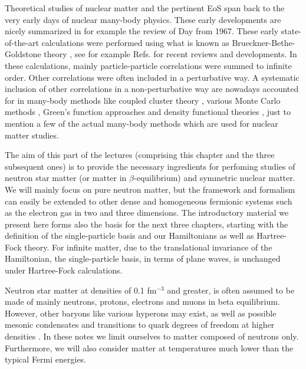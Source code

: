 Theoretical studies of nuclear matter and the pertinent EoS span back
to the very early days of nuclear many-body physics. These early
developments are nicely summarized in for example the review of
Day \cite{day1967} from 1967. These early state-of-the-art
calculations were performed using what is known as
Brueckner-Bethe-Goldstone theory \cite{brueckner1954,brueckner1955}, see for example
Refs.\cite{hh2000,baldo2012,baldo2012a} for recent reviews and developments.  In
these calculations, mainly particle-particle correlations were summed
to infinite order.  Other correlations were often included in a
perturbative way. A systematic inclusion of other correlations in a
non-perturbative way are nowadays accounted for in many-body methods
like coupled cluster theory \cite{bartlett2007,shavittbartlett2009},
various Monte Carlo methods \cite{gandolfi2009,lovato2012}, Green's
function approaches \cite{baldo2012a,carbone2013,dickhoff2004} and density
functional theories \cite{erler2013}, just to mention a few of the
actual many-body methods which are used for nuclear matter studies.


The aim of this part of the lectures (comprising this chapter and the three subsequent ones) 
is to provide the
necessary ingredients for perfoming studies of neutron star matter (or
matter in $\beta$-equilibrium) and symmetric nuclear matter.  We will
mainly focus on pure neutron matter, but the framework and formalism
can easily be extended to other dense and homogeneous fermionic
systems such as the electron gas in two and three dimensions. The
introductory material we present here forms also the basis for the
next three chapters, starting with the definition of the
single-particle basis and our Hamiltonians as well as Hartree-Fock
theory. For infinite matter, due to the translational invariance of
the Hamiltonian, the single-particle basis, in terms of plane waves,
is unchanged under Hartree-Fock calculations.

Neutron star matter at densities of 0.1 fm$^{-3}$ and greater, is
often assumed to be made of mainly neutrons, protons, electrons and
muons in beta equilibrium. However, other baryons like various
hyperons may exist, as well as possible mesonic condensates and
transitions to quark degrees of freedom at higher densities \cite{hh2000}.  
In these notes we limit ourselves to
matter composed of neutrons only.  Furthermore, we will also
consider matter at temperatures much lower than the typical Fermi
energies.  


